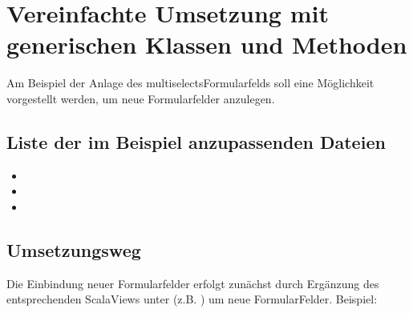 \documentclass[letterpaper,10pt,ngerman]{sphinxmanual}
\begin{document}
\section{Vereinfachte Umsetzung mit generischen Klassen und Methoden}
\label{\detokenize{developer-docs/addForm:vereinfachte-umsetzung-mit-generischen-klassen-und-methoden}}
Am Beispiel der Anlage des multiselects\sphinxhyphen{}Formularfelds soll eine  Möglichkeit vorgestellt werden, um neue Formularfelder anzulegen.


\subsection{Liste der im Beispiel anzupassenden Dateien}
\label{\detokenize{developer-docs/addForm:id1}}\begin{itemize}
\item {} 

\item {} 

\item {} 

\end{itemize}


\subsection{Umsetzungsweg}
\label{\detokenize{developer-docs/addForm:id2}}
Die Einbindung neuer Formularfelder erfolgt zunächst durch Ergänzung des entsprechenden Scala\sphinxhyphen{}Views unter  (z.B. )
um neue Formular\sphinxhyphen{}Felder. Beispiel:
\end{document}
